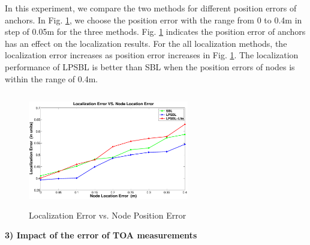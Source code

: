  In this experiment, we compare the two methods for different position errors of anchors. 
 In Fig. \ref{fig5}, we choose the position error with the range from 0 to 0.4m in step of 0.05m for the three methods. 
 Fig. \ref{fig5} indicates the position error of anchors has an effect on the localization results. 
 For the all localization methods, the localization error increases as position error increases in Fig. \ref{fig5}. 
 The localization performance of LPSBL is better than SBL when the position errors of nodes is within the range of 0.4m.
  \begin{figure}[htb]
            \centering
		   \vspace{-2mm}
			 \includegraphics[height=5.0cm,width=7.0cm]{image/locationerror.eps}
              \caption{Localization Error vs. Node Position Error}
             \vspace{-5mm}
             \label{fig5}
        \end{figure}

\textbf{3) Impact of the error of TOA measurements}

